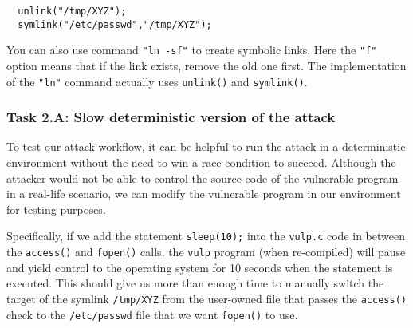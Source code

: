 \begin{lstlisting}
  unlink("/tmp/XYZ");
  symlink("/etc/passwd","/tmp/XYZ");
\end{lstlisting}

You can also use \linux command {\tt "ln -sf"} to create symbolic links.
Here the {\tt "f"} option means that if the link exists, remove the
old one first. The implementation of the
{\tt "ln"} command actually uses {\tt unlink()} and {\tt symlink()}.



\subsubsection{Task 2.A: Slow deterministic version of the attack}  
To test our attack workflow, it can be helpful to run the attack in a
deterministic environment without the need to win a race condition to
succeed.  Although the attacker would not be able to control the source
code of the vulnerable program in a real-life scenario, we can modify
the vulnerable program in our environment for testing purposes.


Specifically, if we add the statement \texttt{sleep(10);} into the
\texttt{vulp.c} code in between the \texttt{access()} and
\texttt{fopen()} calls, the \texttt{vulp} program (when re-compiled)
will pause and yield control to the operating system for 10 seconds when
the statement is executed.  This should give us more than enough time to
manually switch the target of the symlink \texttt{/tmp/XYZ} from the
user-owned file that passes the \texttt{access()} check to the
\texttt{/etc/passwd} file that we want \texttt{fopen()} to use.


